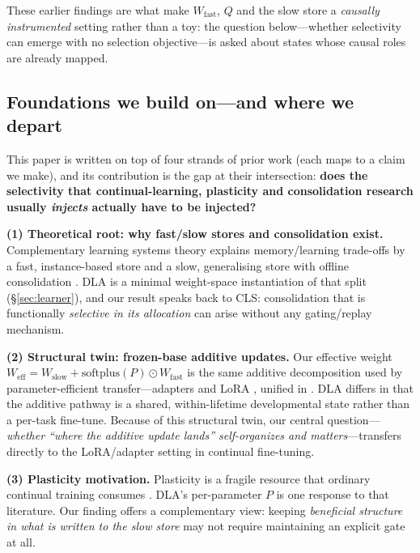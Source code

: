 \documentclass{article} %
\begin{document}
These earlier findings are what make $W_{\mathrm{fast}}$, $Q$ and the slow store a \emph{causally instrumented} setting rather than a toy: the question below---whether selectivity can emerge with no selection objective---is asked about states whose causal roles are already mapped.

\subsection{Foundations we build on---and where we depart}

This paper is written on top of four strands of prior work (each maps to a claim we make), and its contribution is the gap at their intersection: \textbf{does the selectivity that continual-learning, plasticity and consolidation research usually \emph{injects} actually have to be injected?}

\textbf{(1) Theoretical root: why fast/slow stores and consolidation exist.} Complementary learning systems theory explains memory/learning trade-offs by a fast, instance-based store and a slow, generalising store with offline consolidation \citep{mcclelland1995why, kumaran2016what}. DLA is a minimal weight-space instantiation of that split (\S\ref{sec:learner}), and our result speaks back to CLS: consolidation that is functionally \emph{selective in its allocation} can arise without any gating/replay mechanism.

\textbf{(2) Structural twin: frozen-base additive updates.} Our effective weight $W_{\mathrm{eff}} = W_{\mathrm{slow}} + \mathrm{softplus}(P)\odot W_{\mathrm{fast}}$ is the same additive decomposition used by parameter-efficient transfer---adapters \citep{houlsby2019parameter} and LoRA \citep{hu2022lora}, unified in \citet{he2022towards}. DLA differs in that the additive pathway is a shared, within-lifetime developmental state rather than a per-task fine-tune. Because of this structural twin, our central question---\emph{whether ``where the additive update lands'' self-organizes and matters}---transfers directly to the LoRA/adapter setting in continual fine-tuning.

\textbf{(3) Plasticity motivation.} Plasticity is a fragile resource that ordinary continual training consumes \citep{dohare2024loss, lyle2022understanding, nikishin2022primacy}. DLA's per-parameter $P$ is one response to that literature. Our finding offers a complementary view: keeping \emph{beneficial structure in what is written to the slow store} may not require maintaining an explicit gate at all.
\end{document}
